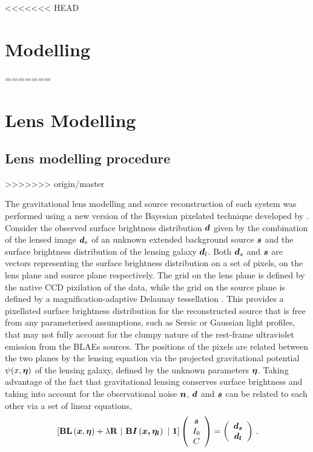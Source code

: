 \documentclass[a4paper,fleqn,usenatbib]{mnras}
\begin{document}
<<<<<<< HEAD
\section{Modelling}
=======
\section{Lens Modelling}
\label{sec:models}

\subsection{Lens modelling procedure}
>>>>>>> origin/master

The gravitational lens modelling and source reconstruction of each system was performed using a new version of the Bayesian pixelated technique developed by \citet{V09}. 
Consider the observed surface brightness distribution $\bmath d$ given by the combination of the lensed image $\bmath d_s$ of an unknown extended background source $\bmath s$ and the surface brightness distribution of the lensing galaxy $\bmath d_l$.  Both $\bmath d_s$ and  $\bmath s$ are vectors representing the surface brightness distribution on a set of pixels, on the lens plane and source plane respectively. The grid on the lens plane is defined by the native CCD pixilation of the data, while the grid on the source plane is defined by a magnification-adaptive Delaunay tessellation \citep[see][for more details]{V09}. This provides a pixellated surface brightness distribution for the reconstructed source that is free from any parameterised assumptions, such as Sersic or Gaussian light profiles, that may not fully account for the clumpy nature of the rest-frame ultraviolet emission from the BLAEs sources.
The positions of the pixels are related between the two planes by the lensing equation via the projected gravitational potential $\psi(x,\bmath{\eta})$ of the lensing galaxy, defined by the unknown parameters $\bmath \eta$. Taking advantage of the fact that gravitational lensing conserves surface brightness and taking into account for the observational noise $\bmath n$, $\bmath d$ and $\bmath s$ can be related to each other via a set of linear equations,
%
\begin{equation}\label{linear_system}
\left[
\mathbf{B}\mathbf{L}\left(\bmath{x},\bmath{\eta}\right)+\lambda \mathbf{R}~|~\mathbf{B}\bmath{I}\left(\bmath{x,\eta_l}\right)~|~\bmath{1}
\right]\left(\begin{array}{c}\bmath s\\ I_0\\C\end{array} \right) = \left(\begin{array}{c}\bmath {d_s}\\ \bmath{d_l}\end{array} \right)\,.
\end{equation}
\end{document}
